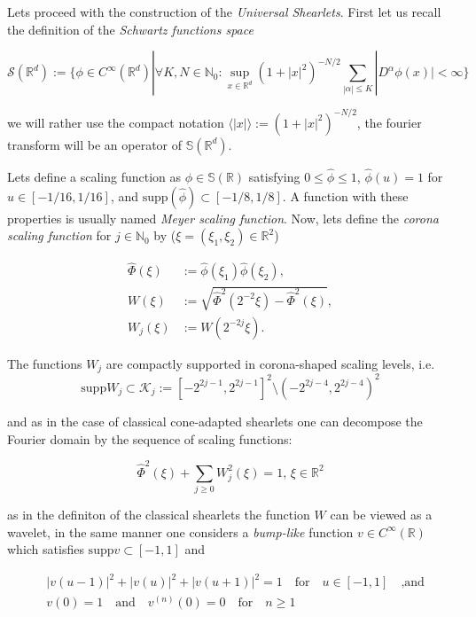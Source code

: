 \bigskip 

Lets proceed with the construction of the \textit{Universal Shearlets}. First let us recall the definition of the \textit{Schwartz functions space} 

$$
\mathcal{S}(\mathbb{R}^d):=\{\phi\in C^{\infty}(\mathbb{R}^d)|\forall K,N\in\mathbb{N}_0:\sup_{x\in\mathbb{R}^d}(1+|x|^2)^{-N/2}\sum_{|\alpha|\leq K}|D^{\alpha}\phi(x)|<\infty\}
$$

we will rather use the compact notation $\langle|x|\rangle:=(1+|x|^2)^{-N/2}$, the fourier transform will be an operator of $\mathbb{S}(\mathbb{R}^d)$. 

\bigskip

Lets define a scaling function as  $\phi\in\mathbb{S}(\mathbb{R})$ satisfying $0\leq \hat{\phi}\leq 1$, $\hat{\phi}(u)=1$ for $u\in [-1/16,1/16]$, and $\text{supp}(\hat{\phi})\subset [-1/8,1/8]$. A function with these properties is usually named \textit{Meyer scaling function}. Now, lets define the \textit{corona scaling function} for $j\in\mathbb{N}_0$ by ($\xi=(\xi_1,\xi_2)\in\mathbb{R}^2$)

$$
\begin{aligned}
\hat{\Phi}(\xi)&:=\hat{\phi}(\xi_1)\hat{\phi}(\xi_2),\\
W(\xi)&:= \sqrt{\hat{\Phi}^2(2^{-2}\xi)-\hat{\Phi}^2(\xi)},\\
W_j(\xi)&:=W(2^{-2j}\xi).
\end{aligned}
$$

The functions $W_j$ are compactly supported in corona-shaped scaling levels, i.e.\,
\begin{equation}
\label{eq:alpha31}
\text{supp}W_j\subset \mathcal{K}_j:=[-2^{2j-1},2^{2j-1}]^2\setminus (-2^{2j-4},2^{2j-4})^2
\end{equation}

and as in the case of classical cone-adapted shearlets one can decompose the Fourier domain by the sequence of scaling functions:

$$
\hat{\Phi}^2(\xi)+\sum_{j\geq 0} W^2_j(\xi)=1\text{,   }\xi\in\mathbb{R}^2
$$ 

as in the definiton of the classical shearlets the function $W$ can be viewed as a wavelet, in the same manner one considers a \textit{bump-like} function $v\in C^{\infty}(\mathbb{R})$ which satisfies $\text{supp}v\subset [-1,1]$ and 

\begin{align}
& |v(u-1)|^2+|v(u)|^2+|v(u+1)|^2 = 1 \quad \textrm{for} \quad u\in[-1,1] \quad \textrm{,and}\label{eq:alpha33}\\
& v(0)=1 \quad \textrm{and} \quad v^{(n)}(0)=0\quad\textrm{for}\quad n\geq 1\label{eq:alpha34}
\end{align}

